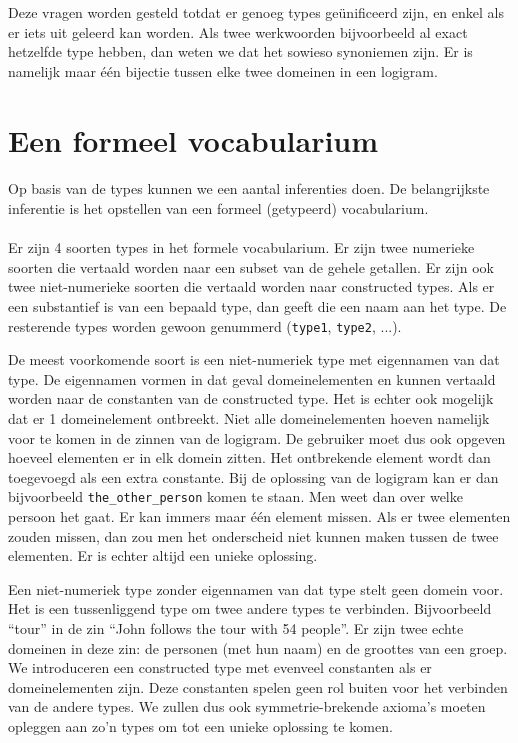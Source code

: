 Deze vragen worden gesteld totdat er genoeg types geünificeerd zijn, en enkel als er iets uit geleerd kan worden. Als twee werkwoorden bijvoorbeeld al exact hetzelfde type hebben, dan weten we dat het sowieso synoniemen zijn. Er is namelijk maar één bijectie tussen elke twee domeinen in een logigram.

\section{Een formeel vocabularium}
\paragraph{} Op basis van de types kunnen we een aantal inferenties doen. De belangrijkste inferentie is het opstellen van een formeel (getypeerd) vocabularium.

\paragraph{}Er zijn 4 soorten types in het formele vocabularium. Er zijn twee numerieke soorten die vertaald worden naar een subset van de gehele getallen. Er zijn ook twee niet-numerieke soorten die vertaald worden naar constructed types. Als er een substantief is van een bepaald type, dan geeft die een naam aan het type. De resterende types worden gewoon genummerd (\texttt{type1}, \texttt{type2}, ...).

De meest voorkomende soort is een niet-numeriek type met eigennamen van dat type. De eigennamen vormen in dat geval domeinelementen en kunnen vertaald worden naar de constanten van de constructed type. Het is echter ook mogelijk dat er 1 domeinelement ontbreekt. Niet alle domeinelementen hoeven namelijk voor te komen in de zinnen van de logigram. De gebruiker moet dus ook opgeven hoeveel elementen er in elk domein zitten. Het ontbrekende element wordt dan toegevoegd als een extra constante. Bij de oplossing van de logigram kan er dan bijvoorbeeld \texttt{the\_other\_person} komen te staan. Men weet dan over welke persoon het gaat. Er kan immers maar één element missen. Als er twee elementen zouden missen, dan zou men het onderscheid niet kunnen maken tussen de twee elementen. Er is echter altijd een unieke oplossing.

Een niet-numeriek type zonder eigennamen van dat type stelt geen domein voor. Het is een tussenliggend type om twee andere types te verbinden. Bijvoorbeeld ``tour'' in de zin ``John follows the tour with 54 people''. Er zijn twee echte domeinen in deze zin: de personen (met hun naam) en de groottes van een groep. We introduceren een constructed type met evenveel constanten als er domeinelementen zijn. Deze constanten spelen geen rol buiten voor het verbinden van de andere types. We zullen dus ook symmetrie-brekende axioma's moeten opleggen aan zo'n types om tot een unieke oplossing te komen.

